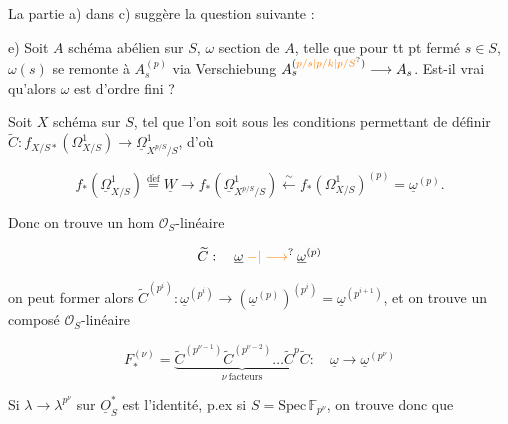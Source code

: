 
La partie a) dans c) suggère la question suivante :

e) Soit $A$ schéma abélien sur $S$, $\omega$ section de $A$, telle que pour tt pt fermé $s\in S$, $\omega(s)$ se remonte à $A_s^{(p)}$ via Verschiebung $A_s^{(\unsure{p/s|p/k|p/S})}\longrightarrow A_s$. Est-il vrai qu'alors $\omega$ est d'ordre fini ?




Soit $X$ schéma sur $S$, tel que l'on soit sous les conditions permettant de définir $\widetilde C:f_{X/S*}(\Omega^1_{X/S})\longrightarrow\underline{\Omega}^1_{X^{p/S}/S}$, d'où


\[
 f_*(\underline\Omega^1_{X/S})\overset{\mathrm{d\acute ef}}{=}\underline W\longrightarrow
 f_*(\underline\Omega^1_{X^{p/S}/S})\stackrel{\sim}{\longleftarrow}
 f_*(\Omega^1_{X/S})^{(p)}=\underline\omega^{(p)}.
\]



Donc on trouve un hom $\mathcal O_S$-linéaire

\[
\widetilde C:\quad\underline\omega\mathbin{\unsure{-|\longrightarrow}}\underline\omega^{(p)}
\]

on peut former alors $\widetilde C^{(p^i)}:\underline\omega^{(p^i)}\longrightarrow(\underline\omega^{(p)})^{(p^i)}=\underline\omega^{(p^{i+1})}$, et on trouve un composé $\mathcal O_S$-linéaire

\[
F_*^{(\nu)}=\underbrace{\widetilde C^{(p^{\nu-1})}\widetilde C^{(p^{\nu-2})}\ldots
\widetilde C^{p}\widetilde C}_{\nu\ \text{facteurs}}:
\quad\underline\omega\longrightarrow\underline\omega^{(p^\nu)}
\]

Si $\lambda\longrightarrow\lambda^{p^\nu}$ sur $\underline O_S^{*}$ est l'identité, p.ex si $S=\mathrm{Spec}\,\mathbb F_{p^\nu}$, on trouve donc que 

